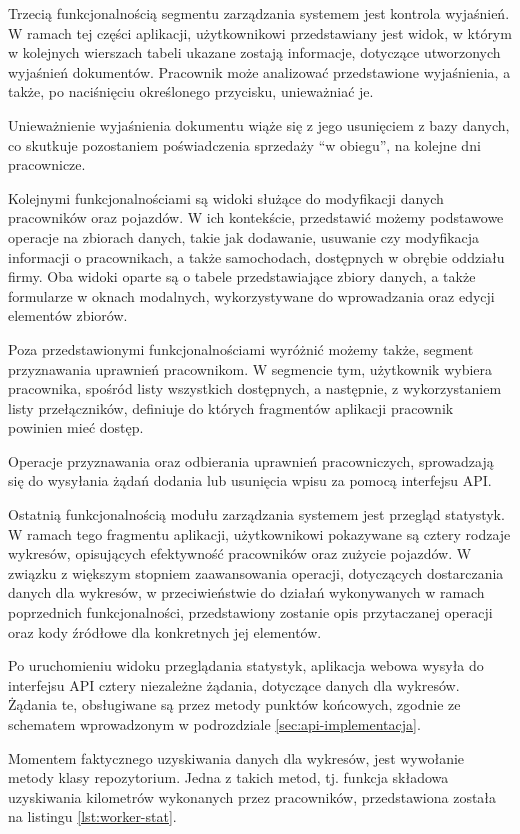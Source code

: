 Trzecią funkcjonalnością segmentu zarządzania systemem jest kontrola wyjaśnień. W ramach tej części aplikacji, użytkownikowi przedstawiany jest widok, w którym w kolejnych wierszach tabeli ukazane zostają informacje, dotyczące utworzonych wyjaśnień dokumentów. Pracownik może analizować przedstawione wyjaśnienia, a także, po naciśnięciu określonego przycisku, unieważniać je.

Unieważnienie wyjaśnienia dokumentu wiąże się z jego usunięciem z bazy danych, co skutkuje pozostaniem poświadczenia sprzedaży "`w obiegu"', na kolejne dni pracownicze.

Kolejnymi funkcjonalnościami są widoki służące do modyfikacji danych pracowników oraz pojazdów. W ich kontekście, przedstawić możemy podstawowe operacje na zbiorach danych, takie jak dodawanie, usuwanie czy modyfikacja informacji o pracownikach, a także samochodach, dostępnych w obrębie oddziału firmy. Oba widoki oparte są o tabele przedstawiające zbiory danych, a także formularze w oknach modalnych, wykorzystywane do wprowadzania oraz edycji elementów zbiorów.

Poza przedstawionymi funkcjonalnościami wyróżnić możemy także, segment przyznawania uprawnień pracownikom. W segmencie tym, użytkownik wybiera pracownika, spośród listy wszystkich dostępnych, a następnie, z wykorzystaniem listy przełączników, definiuje do których fragmentów aplikacji pracownik powinien mieć dostęp.

Operacje przyznawania oraz odbierania uprawnień pracowniczych, sprowadzają się do wysyłania żądań dodania lub usunięcia wpisu za pomocą interfejsu API.

Ostatnią funkcjonalnością modułu zarządzania systemem jest przegląd statystyk. W ramach tego fragmentu aplikacji, użytkownikowi pokazywane są cztery rodzaje wykresów, opisujących efektywność pracowników oraz zużycie pojazdów. W związku z większym stopniem zaawansowania operacji, dotyczących dostarczania danych dla wykresów, w przeciwieństwie do działań wykonywanych w ramach poprzednich funkcjonalności, przedstawiony zostanie opis przytaczanej operacji oraz kody źródłowe dla konkretnych jej elementów.

Po uruchomieniu widoku przeglądania statystyk, aplikacja webowa wysyła do interfejsu API cztery niezależne żądania, dotyczące danych dla wykresów. Żądania te, obsługiwane są przez metody punktów końcowych, zgodnie ze schematem wprowadzonym w podrozdziale \ref{sec:api-implementacja}.

Momentem faktycznego uzyskiwania danych dla wykresów, jest wywołanie metody klasy repozytorium. Jedna z takich metod, tj. funkcja składowa uzyskiwania kilometrów wykonanych przez pracowników, przedstawiona została na listingu \ref{lst:worker-stat}.

